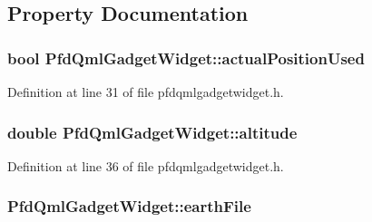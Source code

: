 \subsection{\-Property \-Documentation}
\hypertarget{class_pfd_qml_gadget_widget_a15d0bedd6fb1a7865b3ef2af0fdf303c}{
\subsubsection[{actual\-Position\-Used}]{\setlength{\rightskip}{0pt plus 5cm}bool {\bf \-Pfd\-Qml\-Gadget\-Widget\-::actual\-Position\-Used}}}\label{class_pfd_qml_gadget_widget_a15d0bedd6fb1a7865b3ef2af0fdf303c}


\-Definition at line 31 of file pfdqmlgadgetwidget.\-h.

\hypertarget{class_pfd_qml_gadget_widget_a1ec3b0cfb482e75513c5beb4a016292d}{
\subsubsection[{altitude}]{\setlength{\rightskip}{0pt plus 5cm}double {\bf \-Pfd\-Qml\-Gadget\-Widget\-::altitude}}}\label{class_pfd_qml_gadget_widget_a1ec3b0cfb482e75513c5beb4a016292d}


\-Definition at line 36 of file pfdqmlgadgetwidget.\-h.

\hypertarget{class_pfd_qml_gadget_widget_adc9e7df9c144b68f563c6e72c2cabff7}{
\subsubsection[{earth\-File}]{ {\bf \-Pfd\-Qml\-Gadget\-Widget\-::earth\-File}}}\label{class_pfd_qml_gadget_widget_adc9e7df9c144b68f563c6e72c2cabff7}


